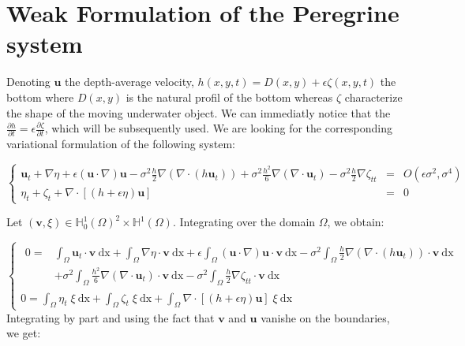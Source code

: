 \documentclass[11pt,a4paper]{article}
\begin{document}
\section{Weak Formulation of the Peregrine system}


Denoting $\mathbf{u}$ the depth-average velocity, $h(x,y,t) = D(x,y) + \epsilon \zeta(x,y,t)$ the bottom where  $D(x,y)$ is the natural profil of the bottom whereas $\zeta$ characterize the shape of the moving underwater object. We can immediatly notice that the $\frac{\partial h}{\partial t} = \epsilon \frac{\partial \zeta}{\partial t}$, which will be subsequently used. We are looking for the corresponding variational formulation of the following system: 
\begin{center}
$\left\lbrace
\begin{array}{rll}
\displaystyle \mathbf{u}_t + \nabla \eta + \epsilon (\mathbf{u} \cdot \nabla)\mathbf{u} - \sigma^2\frac{h}{2}\nabla (\nabla \cdot (h \mathbf{u}_t)) + \sigma^2 \frac{h^2}{6}\nabla (\nabla \cdot \mathbf{u}_t) - \sigma^2\frac{h}{2}\nabla \zeta_{tt}  & = & \displaystyle O(\epsilon \sigma^2, \sigma^4) \\
\displaystyle \eta_t+\zeta_t + \nabla \cdot [(h+\epsilon\eta)\mathbf{u}] & = & 0
\end{array} \right.$
\end{center}

Let $(\mathbf{v},\xi) \in \mathbb{H}^1_0(\Omega)^2 \times \mathbb{H}^1(\Omega)$. Integrating over the domain $\Omega$, we obtain:   


\begin{equation}
	\left\lbrace
		\begin{array}{l}
			\begin{split}
0 = &\int_{\Omega} \! \mathbf{u}_t \cdot \mathbf{v} \: \mathrm{dx} + \int_{\Omega} \! \nabla \eta \cdot \mathbf{v} \: \mathrm{dx} + \epsilon \! \int_{\Omega} \! (\mathbf{u} \cdot \nabla ) \mathbf{u} \cdot \mathbf{v} \: \mathrm{dx} - \sigma^2 \! \int_{\Omega} \! \frac{h}{2} \nabla (\nabla \cdot (h \mathbf{u}_t)) \cdot \mathbf{v} \: \mathrm{dx} \\
&+ \sigma^2 \! \int_{\Omega} \! \frac{h^2}{6} \nabla (\nabla \cdot \mathbf{u}_t) \cdot \mathbf{v} \: \mathrm{dx} - \sigma^2 \! \int_{\Omega} \! \frac{h}{2} \nabla \zeta_{tt} \cdot \mathbf{v} \: \mathrm{dx}
			\end{split} \\
\displaystyle 0 = \int_{\Omega}\! \eta_t \; \xi \: \mathrm{dx} +\int_{\Omega}\! \zeta_t \; \xi \: \mathrm{dx}
+\int_{\Omega}\! \nabla \cdot [(h+\epsilon\eta) \mathbf{u}] \; \xi \: \mathrm{dx}
		\end{array}
	\right.
\end{equation}
Integrating by part and using the fact that $\mathbf{v}$ and $\mathbf{u}$ vanishe on the boundaries, we get: 
\end{document}
